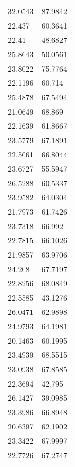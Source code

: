 \documentclass[bwprint]{gmcmthesis}
\begin{document}
\begin{longtable}{ll}
32.0543           & 87.9842            \\
22.437            & 60.3641            \\
22.41             & 48.6827            \\
25.8643           & 50.0561            \\
23.8022           & 75.7764            \\
22.1196           & 60.714             \\
25.4878           & 67.5494            \\
21.0649           & 68.869             \\
22.1639           & 61.8667            \\
23.5779           & 67.1891            \\
22.5061           & 66.8044            \\
23.6727           & 55.5947            \\
26.5288           & 60.5337            \\
23.9582           & 64.0304            \\
21.7973           & 61.7426            \\
23.7318           & 66.992             \\
22.7815           & 66.1026            \\
21.9857           & 63.9706            \\
24.208            & 67.7197            \\
22.8256           & 68.0849            \\
22.5585           & 43.1276            \\
26.0471           & 62.9898            \\
24.9793           & 64.1981            \\
20.1463           & 60.1995            \\
23.4939           & 68.5515            \\
23.0938           & 67.8585            \\
22.3694           & 42.795             \\
26.1427           & 39.0985            \\
23.3986           & 66.8948            \\
20.6397           & 62.1902            \\
23.3422           & 67.9997            \\
22.7726           & 67.2747            \\

\end{longtable}
\end{document}
